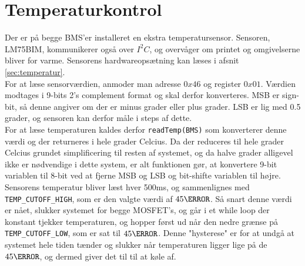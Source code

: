 \section{Temperaturkontrol}\label{sec:temp_protect}
Der er på begge BMS'er installeret en ekstra temperatursensor. Sensoren, LM75BIM, kommunikerer også over $I^2C$, og overvåger om printet og omgivelserne bliver for varme. Sensorens hardwareopsætning kan læses i afsnit \ref{sec:temperatur}. \\

For at læse sensorværdien, anmoder man adresse $0x46$ og register $0x01$. Værdien modtages i 9-bits 2's complement format og skal derfor konverteres. MSB er sign-bit, så denne angiver om der er minus grader eller plus grader. LSB er lig med 0.5 grader, og sensoren kan derfor måle i steps af dette. \\

For at læse temperaturen kaldes derfor \verb|readTemp(BMS)| som konverterer denne værdi og der returneres i hele grader Celcius. Da der reduceres til hele grader Celcius grundet simplificering til resten af systemet, og da halve grader alligevel ikke er nødvendige i dette system, er alt funktionen gør, at konvertere 9-bit variablen til 8-bit ved at fjerne MSB og LSB og bit-shifte variablen til højre. \\

Sensorens temperatur bliver læst hver 500ms, og sammenlignes med \verb|TEMP_CUTOFF_HIGH|, som er den valgte værdi af $45\degreeCelsius$. Så snart denne værdi er nået, slukker systemet for begge MOSFET's, og går i et while loop der konstant tjekker temperaturen, og hopper først ud når den nedre grænse på \verb|TEMP_CUTOFF_LOW|, som er sat til $45\degreeCelsius$. Denne "hysterese" er for at undgå at systemet hele tiden tænder og slukker når temperaturen ligger lige på de $45\degreeCelsius$, og dermed giver det til til at køle af. 